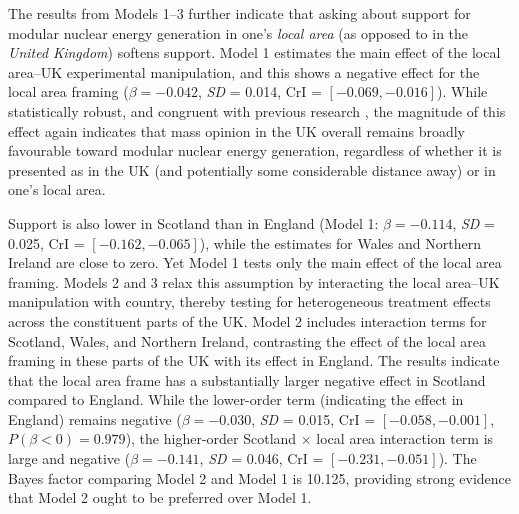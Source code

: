 \documentclass[a4paper, 11pt]{article}
\begin{document}
The results from Models 1--3 further indicate that asking about support for modular nuclear energy generation in one's \emph{local area} (as opposed to in the \emph{United Kingdom}) softens support. Model 1 estimates the main effect of the local area--UK experimental manipulation, and this shows a negative effect for the local area framing ($\beta = -0.042$, \emph{SD} = 0.014, CrI = $[-0.069, -0.016]$). While statistically robust, and congruent with previous research \citep{biten2026,seo2026}, the magnitude of this effect again indicates that mass opinion in the UK overall remains broadly favourable toward modular nuclear energy generation, regardless of whether it is presented as in the UK (and potentially some considerable distance away) or in one's local area.

Support is also lower in Scotland than in England (Model 1: $\beta = -0.114$, \emph{SD} = 0.025, CrI = $[-0.162, -0.065]$), while the estimates for Wales and Northern Ireland are close to zero. Yet Model 1 tests only the main effect of the local area framing. Models 2 and 3 relax this assumption by interacting the local area--UK manipulation with country, thereby testing for heterogeneous treatment effects across the constituent parts of the UK. Model 2 includes interaction terms for Scotland, Wales, and Northern Ireland, contrasting the effect of the local area framing in these parts of the UK with its effect in England. The results indicate that the local area frame has a substantially larger negative effect in Scotland compared to England. While the lower-order term (indicating the effect in England) remains negative ($\beta = -0.030$, \emph{SD} = 0.015, CrI = $[-0.058, -0.001]$, $P(\beta < 0) = 0.979$), the higher-order Scotland $\times$ local area interaction term is large and negative ($\beta = -0.141$, \emph{SD} = 0.046, CrI = $[-0.231, -0.051]$). The Bayes factor comparing Model 2 and Model 1 is 10.125, providing strong evidence that Model 2 ought to be preferred over Model 1.
\end{document}
